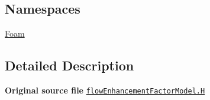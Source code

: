 \subsection*{Namespaces}
\begin{DoxyCompactItemize}
\item 
 \hyperlink{namespaceFoam}{Foam}
\end{DoxyCompactItemize}


\subsection{Detailed Description}
{\bfseries Original source file} \href{../../../home/carlo/data/GeN-Foam/GeN-Foam_ffn/GeN-Foam/GeN-Foam/classes/thermalHydraulics/src/physicsModels/heatTransferModels/FSHeatTransferCoefficientModels/subModels/flowEnhancementFactorModels/flowEnhancementFactorModel.H}{\tt flow\+Enhancement\+Factor\+Model.\+H} 
